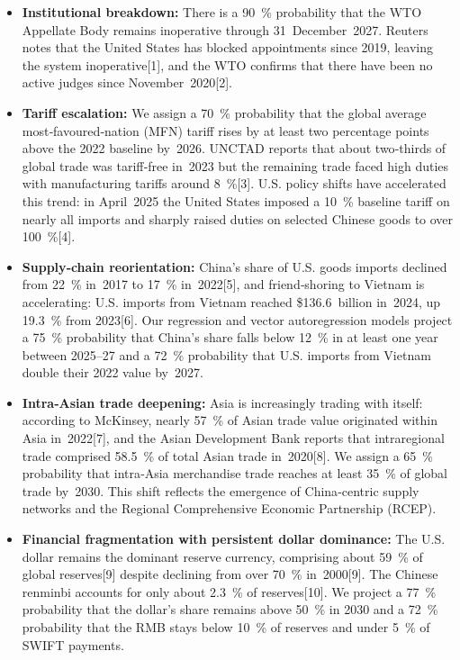 \documentclass{article}
\begin{document}
\begin{itemize}
\item \textbf{Institutional breakdown:}  There is a 90~\% probability that the WTO Appellate Body remains inoperative through 31 December 2027.  Reuters notes that the United States has blocked appointments since 2019, leaving the system inoperative[1], and the WTO confirms that there have been no active judges since November 2020[2].

\item \textbf{Tariff escalation:}  We assign a 70~\% probability that the global average most‑favoured‑nation (MFN) tariff rises by at least two percentage points above the 2022 baseline by 2026.  UNCTAD reports that about two‑thirds of global trade was tariff‑free in 2023 but the remaining trade faced high duties with manufacturing tariffs around 8 \%[3].  U.S. policy shifts have accelerated this trend: in April 2025 the United States imposed a 10 \% baseline tariff on nearly all imports and sharply raised duties on selected Chinese goods to over 100 \%[4].

\item \textbf{Supply‑chain reorientation:}  China’s share of U.S. goods imports declined from 22 \% in 2017 to 17 \% in 2022[5], and friend‑shoring to Vietnam is accelerating: U.S. imports from Vietnam reached \$136.6 billion in 2024, up 19.3 \% from 2023[6].  Our regression and vector autoregression models project a 75~\% probability that China’s share falls below 12 \% in at least one year between 2025–27 and a 72 \% probability that U.S. imports from Vietnam double their 2022 value by 2027.

\item \textbf{Intra‑Asian trade deepening:}  Asia is increasingly trading with itself: according to McKinsey, nearly 57 \% of Asian trade value originated within Asia in 2022[7], and the Asian Development Bank reports that intraregional trade comprised 58.5 \% of total Asian trade in 2020[8].  We assign a 65~\% probability that intra‑Asia merchandise trade reaches at least 35 \% of global trade by 2030.  This shift reflects the emergence of China‑centric supply networks and the Regional Comprehensive Economic Partnership (RCEP).

\item \textbf{Financial fragmentation with persistent dollar dominance:}  The U.S. dollar remains the dominant reserve currency, comprising about 59 \% of global reserves[9] despite declining from over 70 \% in 2000[9].  The Chinese renminbi accounts for only about 2.3 \% of reserves[10].  We project a 77 \% probability that the dollar’s share remains above 50 \% in 2030 and a 72 \% probability that the RMB stays below 10 \% of reserves and under 5 \% of SWIFT payments.


\end{itemize}
\end{document}
